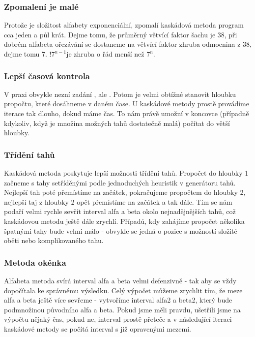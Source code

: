 \documentclass[11pt, titlepage]{article}
\begin{document}
\subsubsection{Zpomalení je malé}

Protože je složitost alfabety exponenciální, zpomalí kaskádová metoda program cca jeden a půl krát. Dejme tomu, že průměrný větvící faktor šachu je 38, při dobrém alfabeta ořezávání se dostaneme na větvící faktor zhruba odmocnina z 38, dejme tomu 7. \begin{math}!7^{n-1}\end{math}je zhruba o řád menší než \begin{math}7^n\end{math}.

\subsubsection{Lepší časová kontrola}

V praxi obvykle nezní zadání , ale . Potom je velmi obtížné stanovit hloubku propočtu, které dosáhneme v daném čase. U kaskádové metody prostě provádíme iterace tak dlouho, dokud máme čas. To nám právě umožní v koncovce (případně kdykoliv, když je množina možných tahů dostatečně malá) počítat do větší hloubky.

\subsubsection{Třídění tahů}

Kaskádová metoda poskytuje lepší možnosti třídění tahů. Propočet do hloubky 1 začneme s tahy setříděnými podle jednoduchých heuristik v generátoru tahů. Nejlepší tah poté přemístíme na začátek, pokračujeme propočtem do hloubky 2, nejlepší taj z hloubky 2 opět přemístíme na začátek a tak dále. Tím se nám podaří velmi rychle sevřít interval alfa a beta okolo nejnadějnějších tahů, což kaskádovou metodu ještě dále zrychlí. Případů, kdy zahájíme propočet několika špatnými tahy bude velmi málo - obvykle se jedná o pozice s možností složité oběti nebo komplikovaného tahu.

\subsubsection{Metoda okénka}

Alfabeta metoda svírá interval alfa a beta velmi defenzivně - tak aby se vždy dopočítala ke správnému výsledku. Celý výpočet můžeme zrychlit tím, že meze alfa a beta ještě více sevřeme - vytvoříme interval alfa2 a beta2, který bude podmnožinou původního alfa a beta. Pokud jsme měli pravdu, ušetřili jsme na výpočtu nějaký čas, pokud ne, interval prostě přeteče a v následující iteraci kaskádové metody se počítá interval s již opravenými mezemi.
\end{document}
